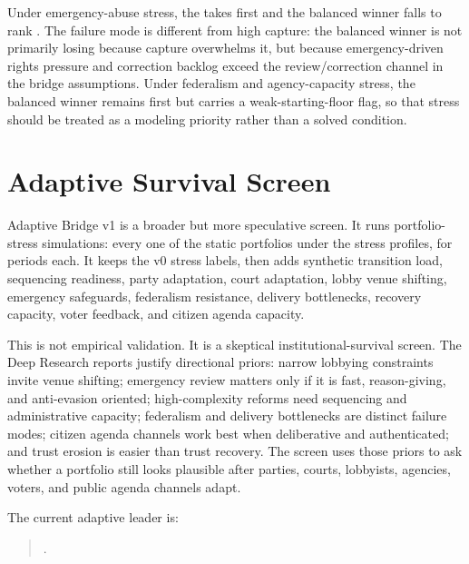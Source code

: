 \documentclass[11pt]{article}
\providecommand{\GeneratedDir}{generated}
\begin{document}
Under emergency-abuse stress, the \EmergencyAbuseWinnerName{} takes first and the balanced winner falls to rank \BalancedEmergencyAbuseRank. The failure mode is different from high capture: the balanced winner is not primarily losing because capture overwhelms it, but because emergency-driven rights pressure and correction backlog exceed the review/correction channel in the bridge assumptions. Under federalism and agency-capacity stress, the balanced winner remains first but carries a weak-starting-floor flag, so that stress should be treated as a modeling priority rather than a solved condition.




\section{Adaptive Survival Screen}

Adaptive Bridge v1 is a broader but more speculative screen. It runs \AdaptiveBridgeRunCount{} portfolio-stress simulations: every one of the \AdaptiveBridgePortfolioCount{} static portfolios under the \StressProfileCount{} stress profiles, for \AdaptiveBridgePeriodCount{} periods each. It keeps the v0 stress labels, then adds synthetic transition load, sequencing readiness, party adaptation, court adaptation, lobby venue shifting, emergency safeguards, federalism resistance, delivery bottlenecks, recovery capacity, voter feedback, and citizen agenda capacity.

This is not empirical validation. It is a skeptical institutional-survival screen. The Deep Research reports justify directional priors: narrow lobbying constraints invite venue shifting; emergency review matters only if it is fast, reason-giving, and anti-evasion oriented; high-complexity reforms need sequencing and administrative capacity; federalism and delivery bottlenecks are distinct failure modes; citizen agenda channels work best when deliberative and authenticated; and trust erosion is easier than trust recovery. The screen uses those priors to ask whether a portfolio still looks plausible after parties, courts, lobbyists, agencies, voters, and public agenda channels adapt.

The current adaptive leader is:

\begin{quote}
\AdaptiveLeaderName.
\end{quote}
\end{document}
